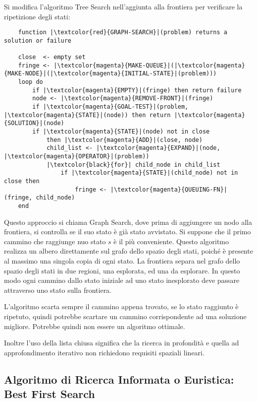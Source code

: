 \documentclass{article}
\numberwithin{equation}{subsection}
\begin{document}
Si modifica l'algoritmo Tree Search nell'aggiunta alla frontiera per verificare la ripetizione 
degli stati:
\begin{verbatim}
    function |\textcolor{red}{GRAPH-SEARCH}|(problem) returns a solution or failure

    close  <- empty set
    fringe <- |\textcolor{magenta}{MAKE-QUEUE}|(|\textcolor{magenta}{MAKE-NODE}|(|\textcolor{magenta}{INITIAL-STATE}|(problem)))
    loop do
        if |\textcolor{magenta}{EMPTY}|(fringe) then return failure
        node <- |\textcolor{magenta}{REMOVE-FRONT}|(fringe)
        if |\textcolor{magenta}{GOAL-TEST}|(problem, |\textcolor{magenta}{STATE}|(node)) then return |\textcolor{magenta}{SOLUTION}|(node)
        if |\textcolor{magenta}{STATE}|(node) not in close
            then |\textcolor{magenta}{ADD}|(close, node)
            child_list <- |\textcolor{magenta}{EXPAND}|(node, |\textcolor{magenta}{OPERATOR}|(problem))
            |\textcolor{black}{for}| child_node in child_list 
                if |\textcolor{magenta}{STATE}|(child_node) not in close then 
                    fringe <- |\textcolor{magenta}{QUEUING-FN}|(fringe, child_node)
    end
\end{verbatim}

Questo approccio si chiama Graph Search, dove prima di aggiungere un nodo alla frontiera, si controlla 
se il suo stato è già stato avvistato. Si suppone che il primo cammino che raggiunge nuo stato $s$ 
è il più conveniente. 
Questo algoritmo realizza un albero direttamente sul grafo dello spazio degli stati, poiché 
è presente al massimo una singola copia di ogni stato. La frontiera separa nel grafo dello 
spazio degli stati in due regioni, una esplorata, ed una da esplorare. In questo modo ogni 
cammino dallo stato iniziale ad uno stato inesplorato deve passare attraverso uno stato 
sulla frontiera. 

L'algoritmo scarta sempre il cammino appena trovato, se lo stato raggiunto è ripetuto, quindi 
potrebbe scartare un cammino corrispondente ad una soluzione migliore. Potrebbe quindi 
non essere un algoritmo ottimale. 

Inoltre l'uso della lista chiusa significa che la ricerca in profondità e quella ad 
approfondimento iterativo non richiedono requisiti spaziali lineari. 

\subsection{Algoritmo di Ricerca Informata o Euristica: Best First Search}
\end{document}
